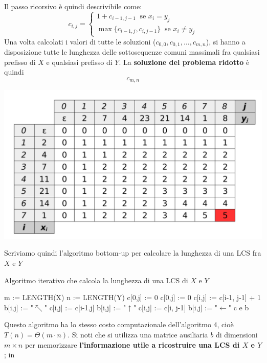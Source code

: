 \documentclass[12pt]{article}
\begin{document}
Il passo ricorsivo è quindi descrivibile come:
$$c_{i,j} = \begin{cases}
    1 + c_{i-1,j-1} \; \; \textrm{se } x_i = y_j \\
    \max\{c_{i-1,j}, c_{i, j-1}\} \; \; \textrm{se } x_i \neq y_j
\end{cases}$$
Una volta calcolati i valori di tutte le soluzioni ($c_{0,0}, c_{0,1}, \dots, c_{m,n}$), si hanno a disposizione tutte le lunghezza delle
sottosequenze comuni massimali fra qualsiasi prefisso di $X$ e qualsiasi prefisso di $Y$. La \textbf{soluzione del problema ridotto} è quindi
$$c_{m,n}$$
\begin{center}
    \includegraphics[width = 0.70\linewidth]{Images/6.png}
\end{center}
Scriviamo quindi l'algoritmo bottom-up per calcolare la lunghezza di una LCS fra $X$ e $Y$
\begin{algorithm}[H]
    \DontPrintSemicolon
    \caption{Algoritmo iterativo che calcola la lunghezza di una LCS di $X$ e $Y$}
     {
        m := LENGTH(X) \;
        n := LENGTH(Y) \;
         {
            c[0,j] := 0
        }
         {
            c[0,j] := 0
        }
         {
             {
                 {
                    c[i,j] := c[i-1, j-1] + 1 \;
                    b[i,j] := "$\nwarrow$" \;
                } {
                     {
                        c[i,j] := c[i-1,j] \;
                        b[i,j] := "$\uparrow$" \;
                    } {
                        c[i,j] := c[i, j-1] \;
                        b[i,j] := "$\leftarrow$"
                    }
                }
            }
        }
        \Return c e b
    }
\end{algorithm} \noindent
Questo algoritmo ha lo stesso costo computazionale dell'algoritmo 4, cioè $T(n) = \Theta(m \cdot n)$.
Si noti che si utilizza una matrice ausiliaria $b$ di dimensioni $m \times n$ per memorizzare \textbf{l'informazione utile a ricostruire una LCS di $X$ e $Y$}; in 
\end{document}
